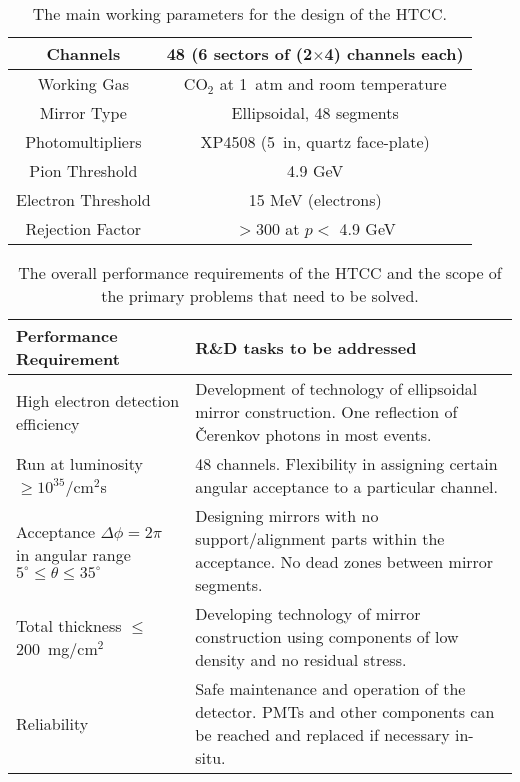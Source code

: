 \begin{table}[htbp]
\begin{center}
\begin{tabular}{|c|c|}  \hline
Channels           & 48 (6 sectors of (2$\times$4) channels each) \\ \hline
Working Gas        & CO$_2$ at 1~atm and room temperature         \\ \hline
Mirror Type        & Ellipsoidal, 48 segments                     \\ \hline
Photomultipliers   & XP4508 (5~in, quartz face-plate)             \\ \hline
Pion Threshold     & 4.9 GeV                                      \\ \hline
Electron Threshold & 15 MeV (electrons)                           \\ \hline
Rejection Factor   & $>$300 at $p<$ 4.9 GeV                       \\ \hline
\end{tabular}
\end{center}
\caption{\small{The main working parameters for the design of the HTCC.}}
\label{htcc_parms}
\end{table}

\begin{table}[htbp]
\begin{center}
\begin{tabular}{|p{}|p{}|} \hline
Performance Requirement            & R\&D tasks to be addressed \\ \hline
High electron detection efficiency & Development of technology of ellipsoidal mirror construction. One reflection of {\v C}erenkov photons in most events. \\ \hline 
Run at luminosity $\geq 10^{35}$/cm$^2$s & 48 channels. Flexibility in assigning certain 
angular acceptance to a particular channel. \\ \hline
Acceptance $\Delta \phi = 2\pi$ in angular range $5^\circ \leq \theta \leq 
35^\circ$ & Designing mirrors with no support/alignment parts within the
acceptance.  No dead zones between mirror segments. \\ \hline
Total thickness $\leq$ 200~mg/cm$^2$ & Developing technology of mirror 
construction using components of low density and no residual stress. \\ \hline
Reliability & Safe maintenance and operation of the detector. PMTs and other components can be reached and 
replaced if necessary in-situ. \\ \hline
\end{tabular}
\end{center}
\caption{\small{The overall performance requirements of the HTCC and the
scope of the primary problems that need to be solved.}}
\label{htcc_reqs}
\end{table}

